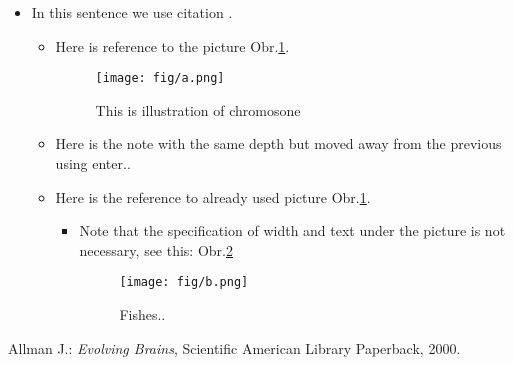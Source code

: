 \documentclass[journal,onecolumn]{IEEEtrancz}
\begin{document}
\begin{itemize}
	\item In this sentence we use citation \cite{kniha}.
	\begin{itemize}
		\item Here is reference to the picture Obr.\ref{a}.

		\begin{figure}[ht]
			\centering
				\texttt{[image: fig/a.png]}
			\caption{This is illustration of chromosone}
			\label{a}
		\end{figure}

			\vspace{3mm}
			\vspace{3mm}
		\item Here is the note with the same depth but moved away from the previous using enter..
		\item Here is the reference to already used picture Obr.\ref{a}.
		\begin{itemize}
			\item Note that the specification of width and text under the picture is not necessary, see this: Obr.\ref{b} 

			\begin{figure}[ht]
				\centering
					\texttt{[image: fig/b.png]}
				\caption{ Fishes..}
				\label{b}
			\end{figure}




\end{itemize}
	\end{itemize}
\end{itemize}
\begin{literatura}{1}
Allman J.: \emph{Evolving Brains}, Scientific American Library Paperback, 2000.
\end{literatura}
\end{document}
